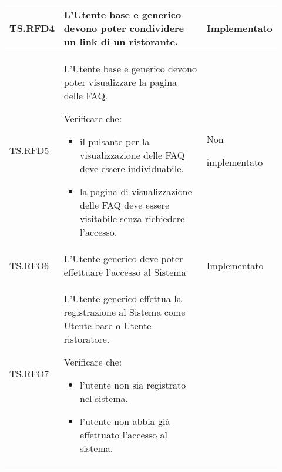 \begin{longtable}{|p{0.10\linewidth}|p{0.70\linewidth}|p{0.12\linewidth}|}
	\hline
	TS.RFD4                                                                                                                         &
	L'Utente base e generico devono poter condividere un link di un ristorante. \par
	                                                                                                                                &
	Implementato                                                                                                                                                            \\
	\hline
	TS.RFD5                                                                                                                         &
	L'Utente base e generico devono poter visualizzare la pagina delle FAQ\g. \par
	Verificare che:
	\begin{itemize}
		\item il pulsante per la visualizzazione delle FAQ deve essere individuabile.
		\item la pagina di visualizzazione delle FAQ deve essere visitabile senza richiedere l'accesso.
	\end{itemize}                                 &
	Non \par implementato                                                                                                                                                   \\
	\hline
	TS.RFO6                                                                                                                         &
	L'Utente generico deve poter effettuare l'accesso al Sistema \par
	                                                                                                                                &
	Implementato                                                                                                                                                            \\
	\hline
	TS.RFO7                                                                                                                         &
	L'Utente generico effettua la registrazione al Sistema come Utente base o Utente ristoratore. \par
	Verificare che:
	\begin{itemize}
		\item l'utente non sia registrato nel sistema.
		\item l'utente non abbia già effettuato l'accesso al sistema.

\end{itemize}
\end{longtable}
